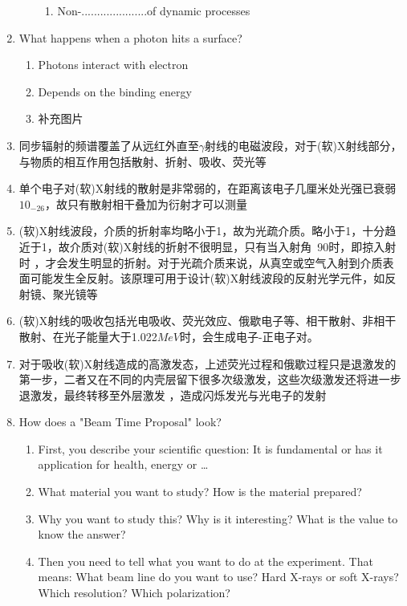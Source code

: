 \documentclass[12pt,a4paper]{article}
\begin{document}
\begin{enumerate}
\begin{enumerate}
\begin{enumerate}
                        \item Non-.....................of dynamic processes
                    \end{enumerate}
                \end{enumerate}
        \item What happens when a photon hits a surface?
            \begin{enumerate}
               \item Photons interact with electron
               \item Depends on the binding energy
               \item 补充图片 
            \end{enumerate}
        \item 同步辐射的频谱覆盖了从远红外直至$\gamma$射线的电磁波段，对于(软)X射线部分，与物质的相互作用包括散射、折射、吸收、荧光等
        \item 单个电子对(软)X射线的散射是非常弱的，在距离该电子几厘米处光强已衰弱$10_{-26}$，故只有散射相干叠加为衍射才可以测量
        \item (软)X射线波段，介质的折射率均略小于1，故为光疏介质。略小于1，十分趋近于1，故介质对(软)X射线的折射不很明显，只有当入射角~90时，即掠入射时
            ，才会发生明显的折射。对于光疏介质来说，从真空或空气入射到介质表面可能发生全反射。该原理可用于设计(软)X射线波段的反射光学元件，如反射镜、聚光镜等
        \item (软)X射线的吸收包括光电吸收、荧光效应、俄歇电子等、相干散射、非相干散射、在光子能量大于1.022$MeV$时，会生成电子-正电子对。
        \item 对于吸收(软)X射线造成的高激发态，上述荧光过程和俄歇过程只是退激发的第一步，二者又在不同的内壳层留下很多次级激发，这些次级激发还将进一步退激发，最终转移至外层激发
            ，造成闪烁发光与光电子的发射
        \item How does a "Beam Time Proposal" look?
            \begin{enumerate}
                \item First, you describe your scientific question: It is fundamental or has it application for health, energy or \dots
                \item What material you want to study? How is the material prepared?
                \item Why you want to study this? Why is it interesting? What is the value to know the answer?
                \item Then you need to tell what you want to do at the experiment. That means: What beam line do you want to use? Hard X-rays or soft X-rays? Which resolution? Which polarization?

\end{enumerate}
\end{enumerate}
\end{document}
